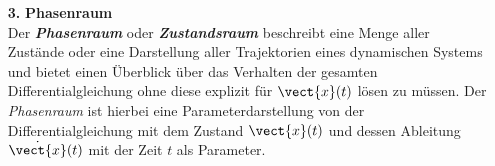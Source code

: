 \begin{itemize}
    \item[\textbf{3.}]\textbf{Phasenraum}\\
    Der \textit{\textbf{Phasenraum}} oder \textit{\textbf{Zustandsraum}} beschreibt eine Menge aller Zustände oder eine Darstellung aller Trajektorien eines dynamischen Systems und bietet einen Überblick über das Verhalten der gesamten Differentialgleichung ohne diese explizit für $\vect{x}(t)$ lösen zu müssen. Der \textit{Phasenraum} ist hierbei eine Parameterdarstellung von der Differentialgleichung mit dem Zustand $\vect{x}(t)$ und dessen Ableitung $\dot{\vect{x}}(t)$ mit der Zeit $t$ als Parameter.\\ %


\end{itemize}
